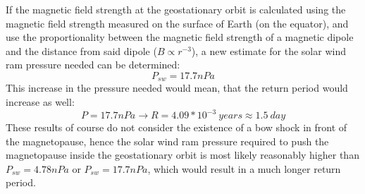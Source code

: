 \documentclass[12pt]{article}
\begin{document}
        If the magnetic field strength at the geostationary orbit is calculated using the magnetic field strength measured on the surface of Earth (on the equator), and use the proportionality between the magnetic field strength of a magnetic dipole and the distance from said dipole ($B\propto r^{-3}$), a new estimate for the solar wind ram pressure needed can be determined:
        \begin{equation}
            P_{sw}=17.7nPa
        \end{equation}
        This increase in the pressure needed would mean, that the return period would increase as well:
        \begin{equation}
            P=17.7nPa\rightarrow R=4.09*10^{-3}\ years\approx1.5\ day
        \end{equation}
        These results of course do not consider the existence of a bow shock in front of the magnetopause, hence the solar wind ram pressure required to push the magnetopause inside the geostationary orbit is most likely reasonably higher than $P_{sw}=4.78nPa$ or $P_{sw}=17.7nPa$, which would result in a much longer return period.
\end{document}
